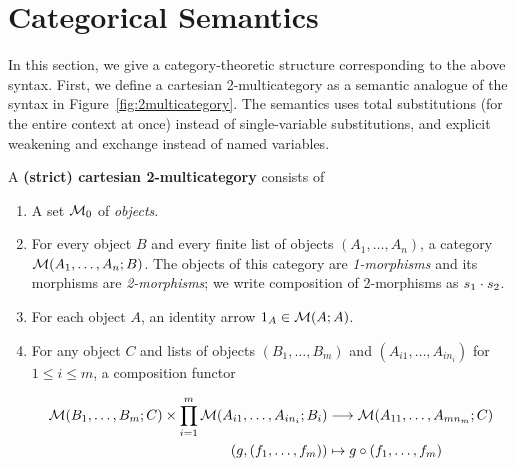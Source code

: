 \newcommand\cD{\ensuremath{\mathcal{D}}}

\section{Categorical Semantics}
\label{sec:semantics}

In this section, we give a category-theoretic structure corresponding to
the above syntax.  First, we define a cartesian 2-multicategory as a
semantic analogue of the syntax in Figure~\ref{fig:2multicategory}. The
semantics uses total substitutions (for the entire context at once)
instead of single-variable substitutions, and explicit weakening and
exchange instead of named variables.

\begin{definition}
  A \textbf{(strict) cartesian 2-multicategory} consists of
  \begin{enumerate}
  \item A set $\mathcal{M}_0$ of \emph{objects}.
  \item For every object $B$ and every finite list of objects $(A_1,\dots,A_n)$, a category $\mathcal{M}(A_1,\dots,A_n;B)$.
    The objects of this category are \emph{1-morphisms} and its morphisms are \emph{2-morphisms}; we write composition of 2-morphisms as $s_1 \cdot s_2$.
  \item For each object $A$, an identity arrow $1_A\in\mathcal{M}(A;A)$.
  \item For any object $C$ and lists of objects $(B_1,\dots,B_m)$ and $(A_{i1},\dots,A_{in_i})$ for $1\le i\le m$, a composition functor
    \begin{footnotesize}
    \begin{align*}
      \mathcal{M}(B_1,\dots,B_m;C) \times \prod_{i=1}^m \mathcal{M}(A_{i1},\dots,A_{in_i};B_i) &\longrightarrow \mathcal{M}(A_{11},\dots,A_{mn_m};C)\\
      (g,(f_1,\dots,f_m)) &\mapsto g\circ (f_1,\dots,f_m)
    \end{align*}
    \end{footnotesize}

\end{enumerate}
\end{definition}
